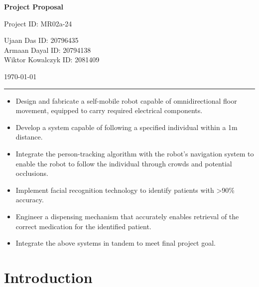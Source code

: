 \documentclass{article}
\begin{document}

\begin{titlepage}
	\centering
    \vfill
    \vspace{3cm}
	{\huge\bfseries Project Proposal\par}
    {\Large Project ID: MR02a-24\par}
	\vspace{2cm}
	{\Large Ujaan Das ID: 20796435\\
                    Armaan Dayal ID: 20794138\\
                    Wiktor Kowalczyk ID: 2081409\\}

	\vfill
	{\large \today\par}
    \vspace{5cm}
    \rule{\textwidth}{0.4pt}
    \begin{itemize}
    \item Design and fabricate a self-mobile robot capable of omnidirectional floor movement, equipped to carry required electrical components.
    \item Develop a system capable of following a specified individual within a 1m distance.
    \item Integrate the person-tracking algorithm with the robot’s navigation system to enable the robot to follow the individual through crowds and potential occlusions.
    \item Implement facial recognition technology to identify patients with >90\% accuracy.
    \item Engineer a dispensing mechanism that accurately enables retrieval of the correct medication for the identified patient.
    \item Integrate the above systems in tandem to meet final project goal.
    \end{itemize}

\end{titlepage}
\tableofcontents
\thispagestyle{empty}
\newpage


\section{Introduction}
\end{document}
